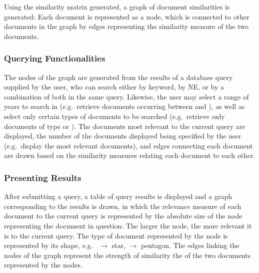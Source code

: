 Using the similarity matrix generated, a graph of document similarities is generated: Each document is represented as a node, which is connected to other documents in the graph by edges representing the similarity measure of the two documents.

\subsubsection {Querying Functionalities}
\label{sec:querying_functionalities}
The nodes of the graph are generated from the results of a database query supplied by the user, who can search either by keyword, by NE, or by a combination of both in the same query. Likewise, the user may select a range of years to search in (e.g.\ retrieve documents occurring between  and ), as well as select only certain types of documents to be searched (e.g.\ retrieve only documents of type  or ). The documents most relevant to the current query are displayed, the number of the documents displayed being specified by the user (e.g.\ display the  most relevant documents), and edges connecting each document are drawn based on the similarity measures relating each document to each other.

\subsubsection {Presenting Results}
\label{sec:presenting_results}
After submitting a query, a table of query results is displayed and a graph corresponding to the results is drawn, in which the relevance measure of each document to the current query is represented by the absolute size of the node representing the document in question: The larger the node, the more relevant it is to the current query. The type of document represented by the node is represented by its shape, e.g.\  $\rightarrow$ star,  $\rightarrow$ pentagon. The edges linking the nodes of the graph represent the strength of similarity the of the two documents represented by the nodes.
